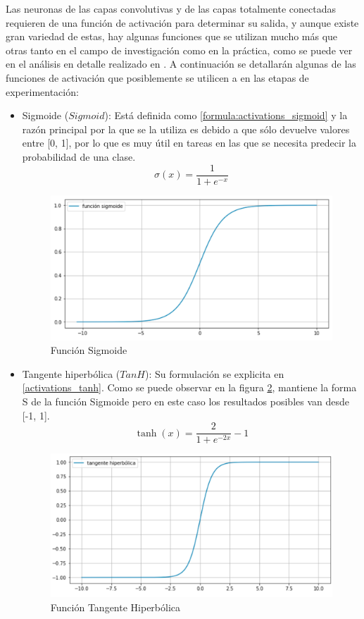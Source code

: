  Las neuronas de las capas convolutivas y de las capas totalmente conectadas requieren de una función de activación para determinar su salida, y aunque existe gran variedad de estas, hay algunas funciones que se utilizan mucho más que otras tanto en el campo de investigación como en la práctica, como se puede ver en el análisis en detalle realizado en \cite{nwankpa2018activation}. A continuación se detallarán algunas de las funciones de activación que posiblemente se utilicen a en las etapas de experimentación:
 \begin{itemize}
 	\item Sigmoide (\(Sigmoid\)): Está definida como \ref{formula:activations_sigmoid} y la razón principal por la que se la utiliza es debido a que sólo devuelve valores entre [0, 1], por lo que es muy útil en tareas en las que se necesita predecir la probabilidad de una clase. 
 	\begin{equation}\label{formula:activations_sigmoid}
 	\sigma(x)=\frac{1}{1+e^{-x}}
 	\end{equation}
 	\begin{figure}[!ht]
 		\centering
 		\includegraphics[width=0.7\linewidth]{images/activations_sigmoid}
 		\caption[Función Sigmoide]{Función Sigmoide}
 		\label{fig:sigmoid}
 	\end{figure}
 	
 	\item Tangente hiperbólica (\(TanH\)): Su formulación se explicita en \ref{activations_tanh}. Como se puede observar en la figura \ref{fig:activationstanh}, mantiene la forma S de la función Sigmoide pero en este caso los resultados posibles van desde [-1, 1]. 
 	\begin{equation}
\label{activations_tanh}
 	\tanh (x)=\frac{2}{1+e^{-2 x}}-1
 	\end{equation}
 	\begin{figure}[!h]
 		\centering
 		\includegraphics[width=0.7\linewidth]{images/activations_tanh}
 		\caption[Función Tangente Hiperbólica]{Función Tangente Hiperbólica}
 		\label{fig:activationstanh}
 	\end{figure}
 	 	 	

\end{itemize}
